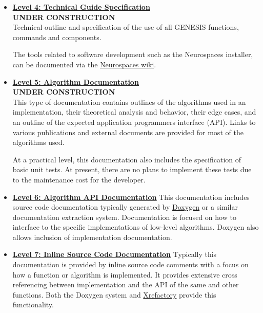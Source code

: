 \documentclass[12pt]{article}
\begin{document}
\begin{itemize}
\item[]\href{../contents-level4/contents-level4.tex}{\bf \underline{Level 4: Technical Guide Specification}}\\
  {\bf UNDER CONSTRUCTION}\\
  Technical outline and specification of the use of all GENESIS
  functions, commands and components.

  The tools related to software development such as the Neurospaces
  installer, can be documented via the
  \href{http://code.google.com/p/neurospaces/wiki/Index}{Neurospaces
    wiki}.

\item[]\href{../contents-level5/contents-level5.tex}{\bf \underline{Level 5: Algorithm Documentation}} \\
  {\bf UNDER CONSTRUCTION}\\
  This type of documentation contains outlines of the algorithms used
  in an implementation, their theoretical analysis and behavior, their
  edge cases, and an outline of the expected application programmers
  interface (API).  Links to various publications and external
  documents are provided for most of the algorithms used.

  At a practical level, this documentation also includes the
  specification of basic unit tests.  At present, there are no plans
  to implement these tests due to the maintenance cost for the
  developer.

\item[]\href{http://www.neurospaces.org/doxygen-menu.html}{\bf \underline{Level 6: Algorithm API Documentation}}
  This documentation includes source code documentation typically
  generated by \href{http://www.stack.nl/~dimitri/doxygen/}{Doxygen}
  or a similar documentation extraction system.  Documentation is
  focused on how to interface to the specific implementations of
  low-level algorithms. Doxygen also allows inclusion of
  implementation documentation.

\item[]\href{http://www.neurospaces.org/cxref-menu.html}{\bf \underline{Level 7: Inline Source Code Documentation}}
  Typically this documentation is provided by inline source code
  comments with a focus on how a function or algorithm is implemented.
  It provides extensive cross referencing between implementation and
  the API of the same and other functions.
  Both the Doxygen system and \href {http://www.xref.sk/xrefactory/main.html}{Xrefactory} provide this
  functionality.
  

\end{itemize}
\end{document}
